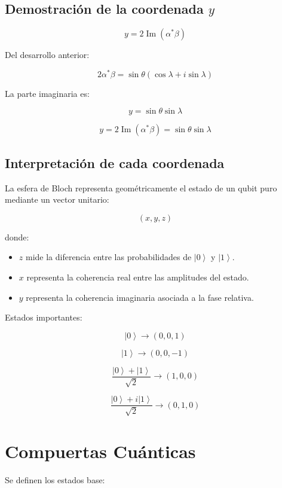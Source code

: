 \documentclass[12pt,a4paper]{article}
\newcommand{\ket}[1]{\left|#1\right\rangle}
\begin{document}
\subsection{Demostración de la coordenada \texorpdfstring{$y$}{y}}

\[
y=2\operatorname{Im}(\alpha^*\beta)
\]

Del desarrollo anterior:

\[
2\alpha^*\beta
=
\sin\theta(\cos\lambda+i\sin\lambda)
\]

La parte imaginaria es:

\[
y=\sin\theta\sin\lambda
\]

\begin{resultado}
\[
\boxed{y=2\operatorname{Im}(\alpha^*\beta)=\sin\theta\sin\lambda}
\]
\end{resultado}

\subsection{Interpretación de cada coordenada}

La esfera de Bloch representa geométricamente el estado de un qubit puro mediante un vector unitario:

\[
(x,y,z)
\]

donde:

\begin{itemize}
    \item \(z\) mide la diferencia entre las probabilidades de \(\ket{0}\) y \(\ket{1}\).
    \item \(x\) representa la coherencia real entre las amplitudes del estado.
    \item \(y\) representa la coherencia imaginaria asociada a la fase relativa.
\end{itemize}

Estados importantes:

\[
\ket{0}\rightarrow(0,0,1)
\]

\[
\ket{1}\rightarrow(0,0,-1)
\]

\[
\frac{\ket{0}+\ket{1}}{\sqrt{2}}\rightarrow(1,0,0)
\]

\[
\frac{\ket{0}+i\ket{1}}{\sqrt{2}}\rightarrow(0,1,0)
\]

\section{Compuertas Cuánticas}

Se definen los estados base:
\end{document}
